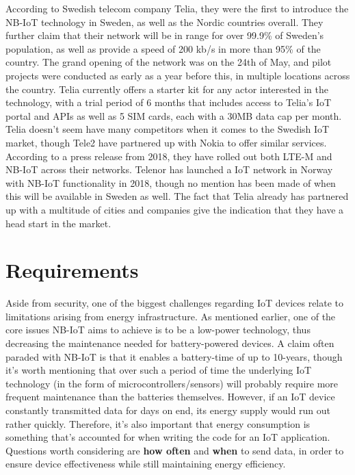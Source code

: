 According to Swedish telecom company Telia, they were the first to introduce the NB-IoT technology in Sweden, as well as the Nordic countries overall\cite{telia-nb}. They further claim that their network will be in range for over 99.9\% of Sweden's population, as well as provide a speed of 200 kb/s in more than 95\% of the country.\cite{telia-first} The grand opening of the network was on the 24th of May, and pilot projects were conducted as early as a year before this, in multiple locations across the country. Telia currently offers a starter kit  for any actor interested in the technology, with a trial period of 6 months that includes access to Telia's IoT portal and APIs as well as 5 SIM cards, each with a 30MB data cap per month. Telia doesn't seem have many competitors when it comes to the Swedish IoT market, though Tele2 have partnered up with Nokia to offer similar services. According to a press release from 2018, they have rolled out both LTE-M and NB-IoT across their networks.\cite{tele2-nokia} Telenor has launched a IoT network in Norway with NB-IoT functionality in 2018, though no mention has been made of when this will be available in Sweden as well.\cite{telenor-iot} The fact that Telia already has partnered up with a multitude of cities and companies give the indication that they have a head start in the market.


\section{Requirements}
Aside from security, one of the biggest challenges regarding IoT devices relate to limitations arising from energy infrastructure. As mentioned earlier, one of the core issues NB-IoT aims to achieve is to be a low-power technology, thus decreasing the maintenance needed for battery-powered devices. A claim often paraded with NB-IoT is that it enables a battery-time of up to 10-years\cite{gsma-nb-iot}, though it's worth mentioning that over such a period of time the underlying IoT technology (in the form of microcontrollers/sensors) will probably require more frequent maintenance than the batteries themselves. However, if an IoT device constantly transmitted data for days on end, its energy supply would run out rather quickly. Therefore, it's also important that energy consumption is something that's accounted for when writing the code for an IoT application. Questions worth considering are \textbf{how often} and \textbf{when} to send data, in order to ensure device effectiveness while still maintaining energy efficiency. 

